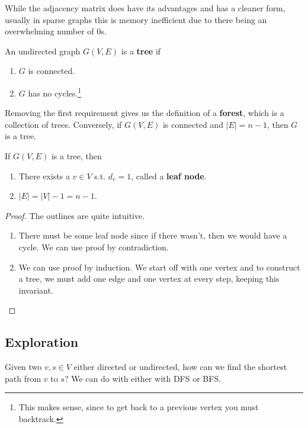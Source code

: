 \documentclass{article}
\begin{document}
    While the adjacency matrix does have its advantages and has a cleaner form, usually in sparse graphs this is memory inefficient due to there being an overwhelming number of $0$s. 

    \begin{definition}[Trees]
      An undirected graph $G(V, E)$ is a \textbf{tree} if 
      \begin{enumerate}
        \item $G$ is connected. 
        \item $G$ has no cycles.\footnote{This makes sense, since to get back to a previous vertex you must backtrack.}
      \end{enumerate}
      Removing the first requirement gives us the definition of a \textbf{forest}, which is a collection of trees. Conversely, if $G(V, E)$ is connected  and $|E| = n - 1$, then $G$ is a tree. 
    \end{definition}

    \begin{theorem}
      If $G(V, E)$ is a tree, then 
      \begin{enumerate}
        \item There exists a $v \in V$ s.t. $d_v = 1$, called a \textbf{leaf node}. 
        \item $|E| = |V| - 1 = n - 1$. 
      \end{enumerate}
    \end{theorem}
    \begin{proof}
      The outlines are quite intuitive. 
      \begin{enumerate}
        \item There must be some leaf node since if there wasn't, then we would have a cycle. We can use proof by contradiction. 
        \item We can use proof by induction. We start off with one vertex and to construct a tree, we must add one edge and one vertex at every step, keeping this invariant.  
      \end{enumerate}
    \end{proof}

  \subsection{Exploration}

    Given two $v, s \in V$ either directed or undirected, how can we find the shortest path from $v$ to $s$? We can do with either with DFS or BFS. 
\end{document}
